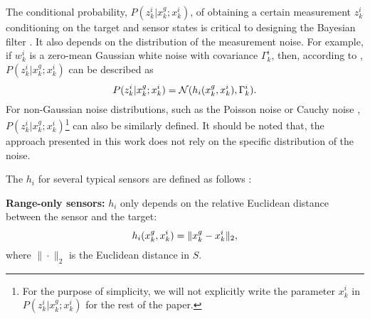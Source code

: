 	The conditional probability, $P(z^i_k|x^g_k;x^i_k)$, of obtaining a certain measurement $z^i_k$ conditioning on the target and sensor states is critical to designing the Bayesian filter \cite{thrun2005probabilistic}. 
	It also depends on the distribution of the measurement noise.
	For example, if $w^i_k$ is a zero-mean Gaussian white noise with covariance $\Gamma_k^i$, then, according to , $P(z^i_k|x^g_k;x^i_k)$ can be described as
	\small\begin{equation*}%
		P(z^i_k|x^g_k;x^i_k)=\mathcal{N}(h_i(\xg_k,x^i_k),\Gamma_k^i).
	\end{equation*}\normalsize
	For non-Gaussian noise distributions, such as the Poisson noise or Cauchy noise \cite{kitagawa1996monte}, $P(z^i_k|x^g_k;x^i_k)$\footnote{For the purpose of simplicity, we will not explicitly write the parameter $x^{i}_k$ in $P(z^i_k|x^g_k;x^i_k)$ for the rest of the paper.} can also be similarly defined.
	It should be noted that, the approach presented in this work does not rely on the specific distribution of the noise.
	
	The $h_i$ for several typical sensors are defined as follows \cite{bishop2010optimality}:
	
	\textbf{Range-only sensors:} 
	$h_i$ only depends on the relative Euclidean distance between the sensor and the target:
	\begin{equation*}%
		h_i(\xg_k,x^i_k)=\|\xg_k-x^i_k\|_2,
	\end{equation*}	
	where $\|\cdot\|_2$ is the Euclidean distance in $S$.
	
